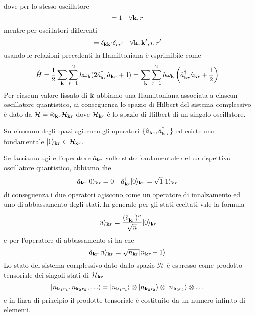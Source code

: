 dove per lo stesso oscillatore 
\begin{equation*}
	[\hat{a}_{\bold{k}r},\hat{a}_{\bold{k}r}^{\dag}] = 1 \quad \forall \bold{k},r
\end{equation*}
mentre per oscillatori differenti
\begin{equation*}
	[\hat{a}_{\bold{k}r},\hat{a}_{\bold{k}'r'}^{\dag}] = \delta_{\bold{k}\bold{k}'}\delta_{rr'} \quad \forall\bold{k},\bold{k}',r,r'
\end{equation*}
usando le relazioni precedenti la Hamiltoniana \`e esprimibile come
\begin{equation}
	\hat{H} = \frac{1}{2}\sum_{\bold{k}}\sum_{r=1}^2 \hbar \omega_{\bold{k}}(2 \hat{a}_{\bold{k}r}^{\dag}\hat{a}_{\bold{k}r} + 1) = \sum_{\bold{k}}\sum_{r=1}^2 \hbar \omega_{\bold{k}}\left(\hat{a}_{\bold{k}r}^{\dag}\hat{a}_{\bold{k}r} + \frac{1}{2} \right)
\end{equation}
Per ciascun valore fissato di $\bold{k}$ abbiamo una Hamiltoniana associata a ciascun oscillatore quantistico, di conseguenza lo spazio di Hilbert del sistema complessivo \`e dato da $\mathcal{H} = \otimes_{\bold{k}r} \mathcal{H}_{\bold{k}r}$ dove $\mathcal{H}_{\bold{k}r}$ \`e lo spazio di Hilbert di un singolo oscillatore.

Su ciascuno degli spazi agiscono gli operatori $\{\hat{a}_{\bold{k}r},\hat{a}_{\bold{k},r}^{\dag}\}$ ed esiste uno fondamentale $|0\rangle_{\bold{k}r} \in \mathcal{H}_{\bold{k}r}$.

\newpage
Se facciamo agire l'operatore $\hat{a}_{\bold{k}r}$ sullo stato fondamentale del corrispettivo oscillatore quantistico, abbiamo che 
\begin{equation*}
	\hat{a}_{\bold{k}r} |0 \rangle_{\bold{k}r} = 0 \quad \hat{a}_{\bold{k}r}^{\dag}|0 \rangle_{\bold{k}r} = \sqrt{1}|1\rangle_{\bold{k}r}
\end{equation*}
di conseguenza i due operatori agiscono come un operatore di innalzamento ed uno di abbassamento degli stati. In generale per gli stati eccitati vale la formula 
\begin{equation*}
	|n \rangle_{\bold{k}r} = \frac{(\hat{a}_{\bold{k}r}^{\dag})^n}{\sqrt{n}}|0 \rangle_{\bold{k}r}
\end{equation*}
e per l'operatore di abbassamento si ha che 
\begin{equation*}
	\hat{a}_{\bold{k}r} |n \rangle_{\bold{k}r} = \sqrt{n_{\bold{k}r}}|n_{\bold{k}r}-1 \rangle 
\end{equation*}
Lo stato del sistema complessivo dato dallo spazio $\mathcal{H}$ \`e espresso come prodotto tensoriale dei singoli stati di $\mathcal{H}_{\bold{k}r}$
\begin{equation}
	|n_{\bold{k}_1 r_1},n_{\bold{k}_2 r_2},\ldots \rangle = |n_{\bold{k}_1 r_1}\rangle \otimes |n_{\bold{k}_2 r_2}\rangle \otimes |n_{\bold{k}_3 r_3} \rangle \otimes \ldots
\end{equation}
e in linea di principio il prodotto tensoriale \`e costituito da un numero infinito di elementi.

